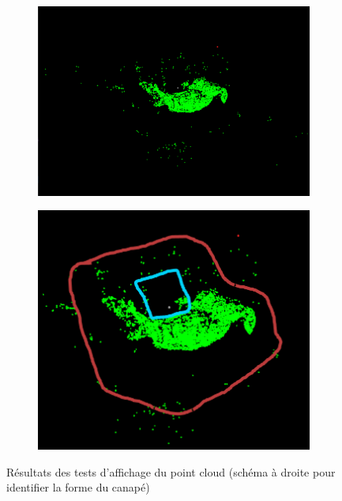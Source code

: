 \begin{figure}[ht]
    \centering
    \begin{subfigure}{0.45\textwidth}
        \includegraphics[width=\linewidth]{datas/helper/test_pointcloud.png}
    \end{subfigure}
    \begin{subfigure}{0.45\textwidth}
        \includegraphics[width=\linewidth]{datas/helper/test_pointcloud_schema.png}
    \end{subfigure}

    \caption{Résultats des tests d'affichage du point cloud (schéma à droite pour identifier la forme du canapé)}
    \label{fig:pointcloud_canap}
\end{figure}